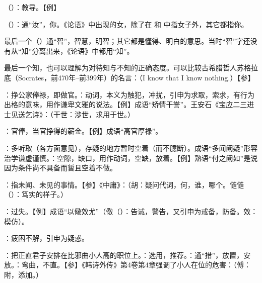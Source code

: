 {
\item {}（）：教导。【例】 
\item {}（）：通“汝”，你。《论语》中出现的女，除了在  和  中指女子外，其它都指你。
\item {}最后一个（）通“智”，智慧，明智；其它都是懂得、明白的意思。当时“智”字还没有从“知”分离出来，《论语》中都用“知”。

最后一个知，也可以理解为对待知与不知的正确态度。可以比较古希腊哲人苏格拉底（Socrates，前470年--前399年）的名言：（I know that I know nothing.）【参】 
}
{}  %


{
\item {}：挣公家俸禄，即做官。：动词，本义为触犯，冲扰，引申为求取，索求，有行为出格的意味，用作谦卑文雅的说法。【例】成语“矫情干誉”。王安石《宝应二三进士见送乞诗》：（干世：涉世，求用于世。）

：官俸，当官挣得的薪金。【例】成语“高官厚禄”。
\item {}：多听取（各方面意见），存疑的地方暂时空着（而不臆断）。成语“多闻阙疑”形容治学谦虚谨慎。：空隙，缺口，用作动词，空缺，放着。【例】熟语“付之阙如”是说因为条件尚不具备而暂且空着不做。
\item {}：指未闻、未见的事情。【参】《中庸》：（胡：疑问代词，何，谁，哪个。慥慥（）：笃实的样子。）
\item {}：过失。【例】成语“以儆效尤”（儆（）：告诫，警告，又引申为戒备，防备。效：模仿）。
\item {}：疲困不解，引申为疑惑。
}
{}


{
\item {}：把正直君子安排在比邪曲小人高的职位上。：选用，推荐。：通“措”，放置，安放。：弯曲，不直。【参】《韩诗外传》第4卷第4章强调了小人在位的危害：（傅：附，添加。）
}
{}


